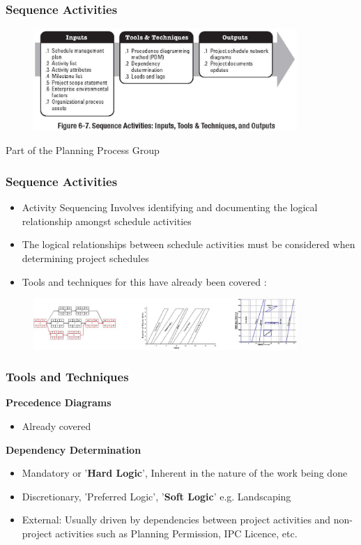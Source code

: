 \begin{frame}
\frametitle{Sequence Activities}
\begin{figure}
	\centering
		\includegraphics[width = 10cm]{images/Fig6-7.jpg}
	\label{fig:6-7}
\end{figure}
Part of the Planning Process Group
\end{frame}




\begin{frame}
\frametitle{Sequence Activities}
\begin{itemize}
	\item Activity Sequencing Involves identifying and documenting the logical relationship amongst schedule activities
	\item The logical relationships between schedule activities must be considered when determining project schedules
	\item Tools and techniques for this have already been covered :
\end{itemize}

\begin{figure}
	\centering
		\includegraphics[width = 10cm]{images/schtypes.jpg}
	\label{fig:schtypes}
\end{figure}

\end{frame}




\begin{frame}
\frametitle{Tools and Techniques}
\textbf{Precedence Diagrams}
\begin{itemize}
	\item Already covered
\end{itemize}
\textbf{Dependency Determination}
\begin{itemize}
	\item Mandatory	or '\textbf{Hard Logic}', Inherent in the nature of the work being done
	\item Discretionary, 'Preferred Logic', '\textbf{Soft Logic}' e.g. Landscaping
	\item External: Usually driven by dependencies between project activities and non-project activities such as Planning Permission, IPC Licence, etc.
\end{itemize}
\end{frame}




